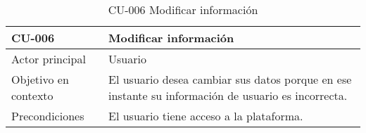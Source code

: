 \begin{table}[htpb]
\centering
\caption{CU-006 Modificar información}                                                                                                                                                                                                                                                                                                                                                                                                                                                                           
\begin{tabularx}{\textwidth}{|X|X|}
\hline
CU-006                            & Modificar información                                                                                                                                                                                                                                                                                                                                                                                                                                                                                \\ \hline
Actor principal                   & Usuario                                                                                                                                                                                                                                                                                                                                                                                                                                                                                              \\ \hline
Objetivo en contexto              & El usuario desea cambiar sus datos porque en ese instante su información de usuario es incorrecta.                                                                                                                                                                                                                                                                                                                                                                                                   \\ \hline
Precondiciones                    & El usuario tiene acceso a la plataforma.                                                                                                                                                                                                                                                                                                                                                                                                                                                             \\ \hline

\end{tabularx}
\end{table}
